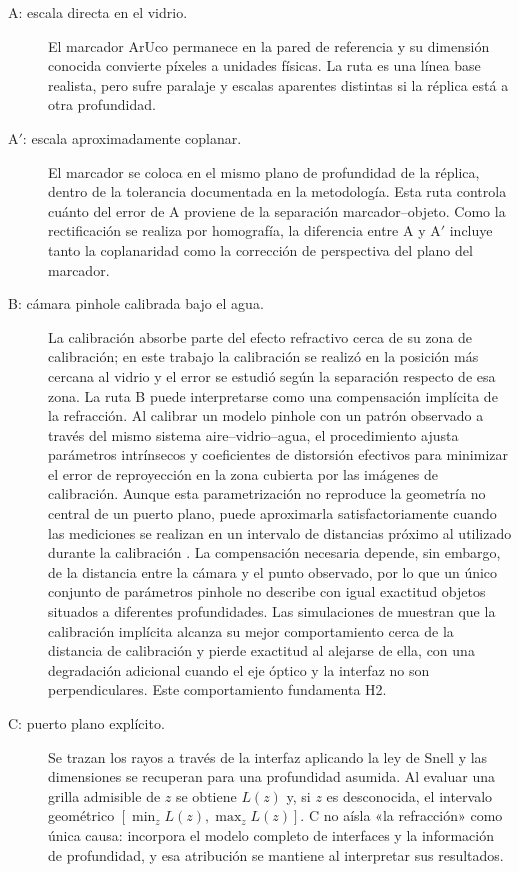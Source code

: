 \documentclass{report}
\newcommand{\Aprime}{A$'$}
\begin{document}
\begin{description}
  \item[A: escala directa en el vidrio.] El marcador ArUco permanece en la pared de referencia y su dimensión conocida convierte píxeles a unidades físicas. La ruta es una línea base realista, pero sufre paralaje y escalas aparentes distintas si la réplica está a otra profundidad.
  \item[\Aprime: escala aproximadamente coplanar.] El marcador se coloca en el mismo plano de profundidad de la réplica, dentro de la tolerancia documentada en la metodología. Esta ruta controla cuánto del error de A proviene de la separación marcador--objeto. Como la rectificación se realiza por homografía, la diferencia entre A y \Aprime{} incluye tanto la coplanaridad como la corrección de perspectiva del plano del marcador.
  \item[B: cámara pinhole calibrada bajo el agua.] La calibración absorbe parte del efecto refractivo cerca de su zona de calibración; en este trabajo la calibración se realizó en la posición más cercana al vidrio y el error se estudió según la separación respecto de esa zona. La ruta B puede interpretarse como una compensación implícita de la refracción. Al calibrar un modelo pinhole con un patrón observado a través del mismo sistema aire--vidrio--agua, el procedimiento ajusta parámetros intrínsecos y coeficientes de distorsión efectivos para minimizar el error de reproyección en la zona cubierta por las imágenes de calibración. Aunque esta parametrización no reproduce la geometría no central de un puerto plano, puede aproximarla satisfactoriamente cuando las mediciones se realizan en un intervalo de distancias próximo al utilizado durante la calibración \parencite{JordtSedlazeck2012,Treibitz2012,Shortis2015}. La compensación necesaria depende, sin embargo, de la distancia entre la cámara y el punto observado, por lo que un único conjunto de parámetros pinhole no describe con igual exactitud objetos situados a diferentes profundidades. Las simulaciones de \textcite{Rofallski2022} muestran que la calibración implícita alcanza su mejor comportamiento cerca de la distancia de calibración y pierde exactitud al alejarse de ella, con una degradación adicional cuando el eje óptico y la interfaz no son perpendiculares. Este comportamiento fundamenta H2.
  \item[C: puerto plano explícito.] Se trazan los rayos a través de la interfaz aplicando la ley de Snell y las dimensiones se recuperan para una profundidad asumida. Al evaluar una grilla admisible de $z$ se obtiene $L(z)$ y, si $z$ es desconocida, el intervalo geométrico $[\min_z L(z), \max_z L(z)]$. C no aísla «la refracción» como única causa: incorpora el modelo completo de interfaces y la información de profundidad, y esa atribución se mantiene al interpretar sus resultados.
\end{description}
\end{document}
